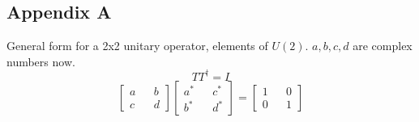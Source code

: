 \documentclass[12pt]{article}
\begin{document}
\subsection{Appendix A}%
General form for a 2x2 unitary operator, elements of $U(2)$. ${a,b,c,d}$ are complex numbers now.
\begin{equation}
TT^{\dag} = I
\end{equation}
\begin{equation}
\begin{bmatrix}
a && b\\
c && d
\end{bmatrix}
\begin{bmatrix}
a^* && c^*\\
b^* && d^*
\end{bmatrix}=
\begin{bmatrix}
1 && 0\\
0 && 1
\end{bmatrix}
\end{equation}
\end{document}

